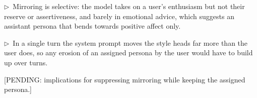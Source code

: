 \documentclass[11pt]{article}
\newcommand{\flow}[1]{\par\noindent\textcolor{blue!60!black}{\small$\triangleright$\ #1}\par\medskip}
\newcommand{\pending}[1]{\par\noindent\textcolor{orange!80!black}{\small[PENDING: #1]}\par\medskip}
\begin{document}
\flow{Mirroring is selective: the model takes on a user's enthusiasm but not their reserve or assertiveness, and barely in emotional advice, which suggests an assistant persona that bends towards positive affect only.}

\flow{In a single turn the system prompt moves the style heads far more than the user does, so any erosion of an assigned persona by the user would have to build up over turns.}

\pending{implications for suppressing mirroring while keeping the assigned persona.}
\end{document}
